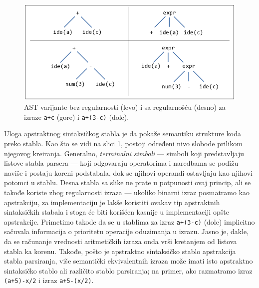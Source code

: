 \begin{figure}[h!]
\centering
\includegraphics[scale=0.7]{images/ast.png}
\caption{AST varijante bez regularnosti (levo) i sa regularnošću (desno) za izraze \texttt{a+c} (gore) i \texttt{a+(3-c)} (dole).} 
\label{fig:ASTVariants}
\end{figure}

Uloga apstraktnog sintaksičkog stabla \cite{FormalSyntaxAndSemantics} je da pokaže semantiku strukture koda preko stabla. Kao što se vidi na slici \ref{fig:ASTVariants}, postoji određeni nivo slobode prilikom njegovog kreiranja. Generalno, \emph{terminalni simboli} --- simboli koji predstavljaju listove stabla parsera --- koji odgovaraju operatorima i naredbama se podižu naviše i postaju koreni podstabala, dok se njihovi operandi ostavljaju kao njihovi potomci u stablu. Desna stabla sa slike ne prate u potpunosti ovaj princip, ali se takođe koriste zbog regularnosti izraza --- ukoliko binarni izraz posmatramo kao apstrakciju, za implementaciju je lakše koristiti ovakav tip apstraktnih sintaksičkih stabala i stoga će biti korišćen kasnije u implementaciji opšte apstrakcije. Primetimo takođe da se u stablima za izraz \texttt{a+(3-c)} (dole) implicitno sačuvala informacija o prioritetu operacije oduzimanja u izrazu. Jasno je, dakle, da se računanje vrednosti aritmetičkih izraza onda vrši kretanjem od listova stabla ka korenu. Takođe, pošto je apstraktno sintaksičko stablo apstrakcija stabla parsiranja, više semantički ekvivalentnih izraza može imati isto apstraktno sintaksičko stablo ali različito stablo parsiranja; na primer, ako razmatramo izraz \texttt{(a+5)-x/2} i izraz \texttt{a+5-(x/2)}.

